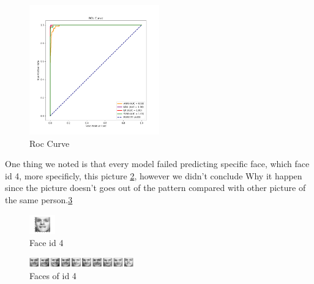 \documentclass[12pt,a4paper,twocolumn]{article}
\begin{document}
\begin{figure}[H]
\includegraphics[width=0.5\textwidth]{images2/ROC.png}
\centering
\caption{\label{fig:roc} Roc Curve}
\end{figure}

\par One thing we noted is that every model failed predicting specific face, which  face id 4, more specificly, this picture \ref{fig:id4}, however we didn't conclude Why it happen since the picture doesn't goes out of the pattern compared with other picture of the same person.\ref{fig:id4_2}

\begin{figure}[H]
\includegraphics[width=0.1\textwidth]{images2/id4.png}
\centering
\caption{\label{fig:id4} Face id 4}
\end{figure}

\begin{figure}[H]
\includegraphics[width=0.4\textwidth]{images2/id4_2.PNG}
\centering
\caption{\label{fig:id4_2} Faces of id 4}
\end{figure}
\end{document}

